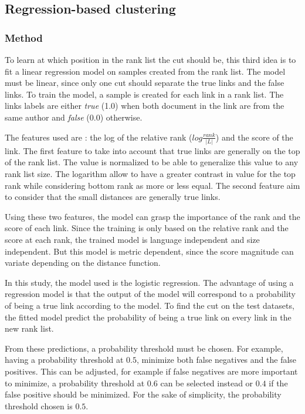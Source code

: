 \subsection{Regression-based clustering \label{sec:regression-based_clustering}}

\subsubsection{Method}

To learn at which position in the rank list the cut should be, this third idea is to fit a linear regression model on samples created from the rank list.
The model must be linear, since only one cut should separate the true links and the false links.
To train the model, a sample is created for each link in a rank list.
The links labels are either \textit{true} (1.0) when both document in the link are from the same author and \textit{false} (0.0) otherwise.

The features used are : the log of the relative rank ($log \frac{rank}{|L|}$) and the score of the link.
The first feature to take into account that true links are generally on the top of the rank list.
The value is normalized to be able to generalize this value to any rank list size.
The logarithm allow to have a greater contrast in value for the top rank while considering bottom rank as more or less equal.
The second feature aim to consider that the small distances are generally true links.

Using these two features, the model can grasp the importance of the rank and the score of each link.
Since the training is only based on the relative rank and the score at each rank, the trained model is language independent and size independent.
But this model is metric dependent, since the score magnitude can variate depending on the distance function.

In this study, the model used is the logistic regression.
The advantage of using a regression model is that the output of the model will correspond to a probability of being a true link according to the model.
To find the cut on the test datasets, the fitted model predict the probability of being a true link on every link in the new rank list.

From these predictions, a probability threshold must be chosen.
For example, having a probability threshold at $0.5$, minimize both false negatives and the false positives.
This can be adjusted, for example if false negatives are more important to minimize, a probability threshold at $0.6$ can be selected instead or $0.4$ if the false positive should be minimized.
For the sake of simplicity, the probability threshold chosen is $0.5$.

